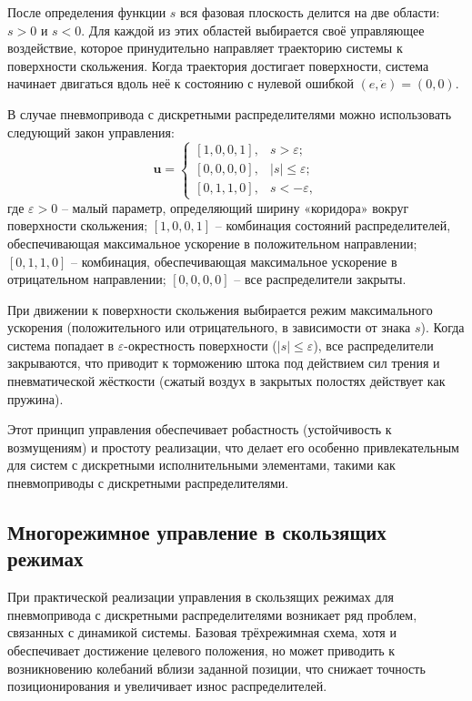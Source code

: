 После определения функции $s$ вся фазовая плоскость делится на
две области: $s > 0$ и $s < 0$. Для каждой из этих областей выбирается своё управляющее
воздействие, которое принудительно направляет траекторию системы к поверхности скольжения. Когда траектория достигает
поверхности, система начинает двигаться вдоль неё к состоянию с нулевой ошибкой $(e, \dot{e}) = (0, 0)$.

В случае пневмопривода с дискретными распределителями можно использовать следующий закон управления:
\begin{equation}
	\mathbf{u} = \begin{cases}
		[1,0,0,1], & s > \varepsilon;      \\
		[0,0,0,0], & |s| \leq \varepsilon; \\
		[0,1,1,0], & s < -\varepsilon,
	\end{cases}
\end{equation}
где $\varepsilon > 0$ -- малый параметр, определяющий ширину «коридора» вокруг поверхности скольжения; $[1,0,0,1]$ -- комбинация состояний
распределителей, обеспечивающая максимальное ускорение в положительном направлении; $[0,1,1,0]$ -- комбинация, обеспечивающая максимальное
ускорение в отрицательном направлении; $[0,0,0,0]$ -- все распределители закрыты.

При движении к поверхности скольжения выбирается режим максимального ускорения (положительного или отрицательного, в зависимости
от знака $s$). Когда система попадает в $\varepsilon$-окрестность поверхности ($|s| \leq \varepsilon$), все распределители закрываются,
что приводит к торможению штока под действием сил трения и пневматической жёсткости (сжатый воздух в закрытых полостях действует как пружина).

Этот принцип управления обеспечивает робастность (устойчивость к возмущениям) и простоту реализации, что делает его особенно
привлекательным для систем с дискретными исполнительными элементами, такими как пневмоприводы с дискретными распределителями.

\subsection*{Многорежимное управление в скользящих режимах}\label{subsec:ch3/sec3/sub2}

При практической реализации управления в скользящих режимах для пневмопривода с дискретными распределителями возникает
ряд проблем, связанных с динамикой системы. Базовая трёхрежимная схема, хотя и обеспечивает достижение целевого положения,
но может приводить к возникновению колебаний вблизи заданной позиции, что снижает точность позиционирования и увеличивает износ распределителей.

